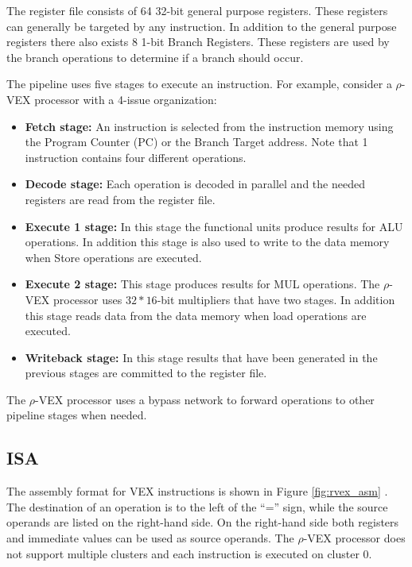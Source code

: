 The register file consists of 64 32-bit general purpose registers. These registers can generally be targeted by any instruction. In addition to the general purpose registers there also exists 8 1-bit Branch Registers. These registers are used by the branch operations to determine if a branch should occur.

The pipeline uses five stages to execute an instruction. For example, consider a $\rho$-VEX processor with a 4-issue organization:

\begin{itemize}
  \item \textbf{Fetch stage:} An instruction is selected from the instruction memory using the Program Counter (PC) or the Branch Target address. Note that 1 instruction contains four different operations.
  \item \textbf{Decode stage:} Each operation is decoded in parallel and the needed registers are read from the register file. 
  \item \textbf{Execute 1 stage:} In this stage the functional units produce results for ALU operations. In addition this stage is also used to write to the data memory when Store operations are executed. 
  \item \textbf{Execute 2 stage:} This stage produces results for MUL operations. The $\rho$-VEX processor uses $32*16$-bit multipliers that have two stages. In addition this stage reads data from the data memory when load operations are executed.
  \item \textbf{Writeback stage:} In this stage results that have been generated in the previous stages are committed to the register file.
\end{itemize}

The $\rho$-VEX processor uses a bypass network to forward operations to other pipeline stages when needed.

\subsection{ISA}
The assembly format for VEX instructions is shown in Figure \ref{fig:rvex_asm} \cite{Joseph-A.-Fisher:2012rm}. The destination of an operation is to the left of the “=” sign, while the source operands are listed on the right-hand side. On the right-hand side both registers and immediate values can be used as source operands. The $\rho$-VEX processor does not support multiple clusters and each instruction is executed on cluster 0.

